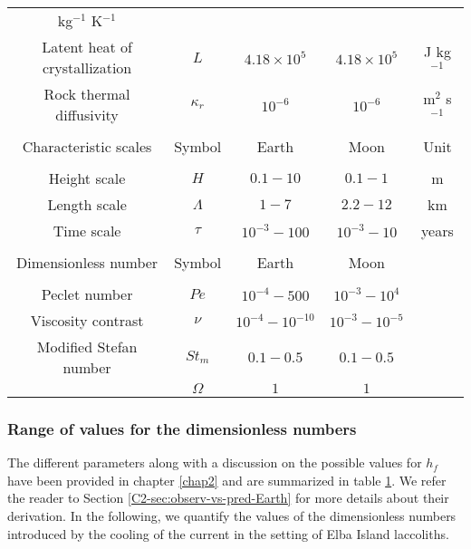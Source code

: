 \begin{table}[h!]
\begin{center}
{\begin{tabular}{c|c|c|c|c}
                                                                      kg$^{-1}$ K$^{-1}$\\
        Latent       heat       of      crystallization&       $L$       &
                                                                           $4.18\times10^5$&$4.18\times10^5$& J kg$^{-1}$\\
        Rock  thermal  diffusivity  &$\kappa_r$& $10^{-6}$  &$10^{-6}$  &
                                                                          m$^{2}$
                                                                          s$^{-1}$\\
                  &&&&\\
        \hline
        Characteristic scales & Symbol & Earth & Moon&Unit\\
        \hline
                  &&&&\\
        Height scale & $H$& $0.1-10$ &$0.1-1$ &m \\
        Length scale & $\Lambda$ & $1-7$&$2.2-12$& km \\
        Time scale & $\tau$ & $10^{-3}-100$&$10^{-3}-10$& years \\
                  &&&&\\
        \hline
        Dimensionless number & Symbol & Earth & Moon&\\
        \hline
                  &&&&\\
        Peclet number &$Pe$& $10^{-4}-500$&$10^{-3}-10^4$ &\\
        Viscosity contrast & $\nu$ & $10^{-4}-10^{-10}$& $10^{-3}-10^{-5}$&\\
        Modified Stefan number & $St_m$ & $0.1-0.5$ &  $0.1-0.5$ &\\
                  &$\Omega$ & $1$ & $1$&
                                         \label{C4-tab2}
      \end{tabular} 
    }
  \end{center}
  \label{C4-tab}
\end{table}

\subsubsection*{Range of values for the dimensionless numbers}
\label{C4-sec:range-valu-dimens}
 
The  different parameters  along  with a  discussion  on the  possible
values for  $h_f$ have  been provided in  chapter \ref{chap2}  and are
summarized  in table  \ref{C4-tab}.  We  refer the  reader to  Section
\ref{C2-sec:observ-vs-pred-Earth} for  more details about  their derivation.
In the following, we quantify  the values of the dimensionless numbers
introduced by the cooling of the current in the setting of Elba Island
laccoliths.

